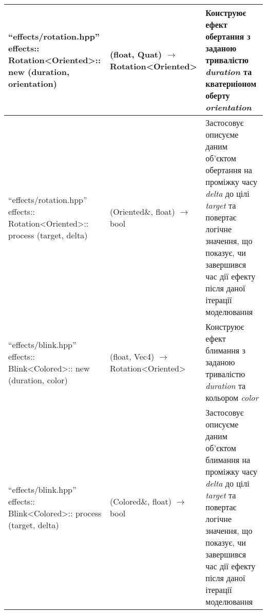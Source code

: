 {\begin{longtable}{| C{6cm} | C{4cm} | C{5cm} |}
    \hline
    ``effects/rotation.hpp'' \newline effects:: \newline Rotation<Oriented>:: \newline
    new \newline (duration, orientation)
    & (float, Quat) $\to$ Rotation<Oriented>
    & Конструює ефект обертання з заданою тривалістю \emph{duration}
    та кватерніоном оберту \emph{orientation} \\
    \hline
    ``effects/rotation.hpp'' \newline effects:: \newline Rotation<Oriented>:: \newline
    process \newline (target, delta)
    & (Oriented\&, float) $\to$ bool
    & Застосовує описуєме даним об'єктом обертання на проміжку часу \emph{delta}
    до цілі \emph{target} та повертає логічне значення, що показує,
    чи завершився час дії ефекту після даної ітерації моделювання \\

    \hline
    ``effects/blink.hpp'' \newline effects:: \newline Blink<Colored>:: \newline
    new \newline (duration, color)
    & (float, Vec4) $\to$ Rotation<Oriented>
    & Конструює ефект блимання з заданою тривалістю \emph{duration} та кольором \emph{color} \\
    \hline
    ``effects/blink.hpp'' \newline effects:: \newline Blink<Colored>:: \newline
    process \newline (target, delta)
    & (Colored\&, float) $\to$ bool
    & Застосовує описуєме даним об'єктом блимання на проміжку часу \emph{delta}
    до цілі \emph{target} та повертає логічне значення, що показує,
    чи завершився час дії ефекту після даної ітерації моделювання \\


\end{longtable}}
